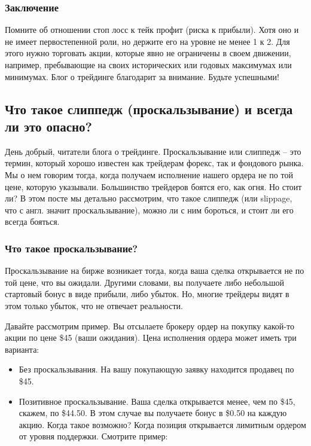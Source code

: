\documentclass[a5paper]{article}
\begin{document}
\subsubsection{Заключение}

Помните об отношении стоп лосс к тейк профит (риска к прибыли). Хотя оно и не имеет первостепенной роли, но держите его на уровне не менее 1 к 2. Для этого нужно торговать акции, которые явно не ограничены в своем движении, например, пребывающие на своих исторических или годовых максимумах или минимумах. Блог о трейдинге благодарит за внимание. Будьте успешными!

\subsection{Что такое слиппедж (проскальзывание) и всегда ли это
  опасно?}

День добрый, читатели блога о трейдинге. Проскальзывание или слиппедж
– это термин, который хорошо известен как трейдерам форекс, так и
фондового рынка. Мы о нем говорим тогда, когда получаем исполнение
нашего ордера не по той цене, которую указывали. Большинство трейдеров
боятся его, как огня. Но стоит ли? В этом посте мы детально
рассмотрим, что такое слиппедж (или slippage, что с англ. значит
проскальзывание), можно ли с ним бороться, и стоит ли его всегда
бояться.

\subsubsection{Что такое проскальзывание?}

Проскальзывание на бирже возникает тогда, когда ваша сделка открывается не по той цене, что вы ожидали. Другими словами, вы получаете либо небольшой стартовый бонус в виде прибыли, либо убыток. Но, многие трейдеры видят в этом только убыток, что не отвечает реальности.

Давайте рассмотрим пример. Вы отсылаете брокеру ордер на покупку какой-то акции по цене \$45 (ваши ожидания). Цена исполнения ордера может иметь три варианта:
\begin{itemize}
\item     Без проскальзывания. На вашу покупающую заявку находится продавец по \$45.
\item     Позитивное проскальзывание. Ваша сделка открывается менее, чем по \$45, скажем, по \$44.50. В этом случае вы получаете бонус в \$0.50 на каждую акцию. Когда такое возможно? Когда позиция открывается лимитным ордером от уровня поддержки. Смотрите пример:
\end{itemize}
\end{document}
